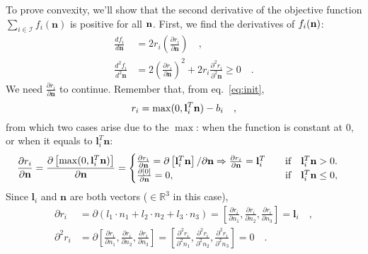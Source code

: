 To prove convexity, we'll show that the second derivative of the objective function $\sum_{i \in \mathcal{I}} f_i(\mathbf{n})$ is positive for all ${\bf n}$. First, we find the derivatives of $f_i({\bf n})$:
\begin{align}
\frac{df_i}{d\mathbf{n}} &= 2r_i \left( \frac{\partial r_i}{\partial \mathbf{n}} \right) \quad, \label{eq:firstder}\\
\frac{d^2f_i}{d^2\mathbf{n}} &= 2\left(\frac{\partial r_i}{\partial \mathbf{n}}\right)^2 + 2r_i \frac{\partial ^2 r_i}{\partial ^2 \mathbf{n}} \geq 0 \quad \label{eq:secder}.
\end{align}
We need $\frac{\partial r_i}{\partial \mathbf{n}}$ to continue. Remember that, from eq.~\eqref{eq:init},
\begin{equation}
r_i = \max( 0, \mathbf{l}_i^T \mathbf{n} ) - b_i\\
\quad,
\end{equation}
from which two cases arise due to the $\max$: when the function is constant at 0, or when it equals to $\mathbf{l}_i^T \mathbf{n}$:
\begin{equation}
\frac{\partial r_i}{\partial \mathbf{n}} = \frac{\partial \left[ \max(0, \mathbf{l}_i^T \mathbf{n}) \right]}{\partial \mathbf{n}}  = 
\begin{cases}
\frac{\partial r_i}{\partial \mathbf{n}} = \partial \left[ \mathbf{l}_i^T \mathbf{n} \right]/\partial \mathbf{n} \Rightarrow  \frac{\partial r_i}{\partial \mathbf{n}} = \mathbf{l}_i^T \qquad \text{if} \quad \mathbf{l}_i^T \mathbf{n} > 0        . \\
\frac{\partial [0]}{\partial \mathbf{n}} = 0, \hfill \text{if} \quad \mathbf{l}_i^T \mathbf{n} \leq 0,
\end{cases}\\
\end{equation}
Since $\mathbf{l}_i$ and $\mathbf{n}$ are both vectors ($\in \mathbb{R}^3$ in this case),
\begin{align}
\partial r_i &= \partial(l_1 \cdot n_1 + l_2 \cdot n_2 + l_3 \cdot n_3) = \left[ \frac{\partial r_i}{\partial n_1}, \frac{\partial r_i}{\partial n_2}, \frac{\partial r_i}{\partial n_3} \right] = \mathbf{l}_i \quad, \\
\partial^2 r_i &= \partial\left[ \frac{\partial r_i}{\partial n_1}, \frac{\partial r_i}{\partial n_2}, \frac{\partial r_i}{\partial n_3} \right] = \left[ \frac{\partial ^2 r_i}{\partial ^2 n_1}, \frac{\partial ^2 r_i}{\partial ^2 n_2}, \frac{\partial ^2 r_i}{\partial ^2 n_3} \right] = 0 \quad.
\end{align}
